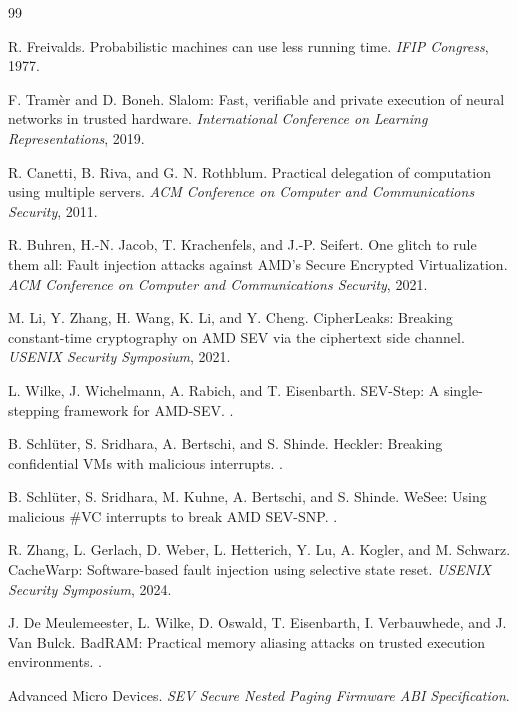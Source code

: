 \documentclass[11pt]{article}
\begin{document}
\begin{thebibliography}{99}

R. Freivalds.
\newblock Probabilistic machines can use less running time.
\newblock \emph{IFIP Congress}, 1977.

F. Tram\`er and D. Boneh.
\newblock Slalom: Fast, verifiable and private execution of neural networks in trusted hardware.
\newblock \emph{International Conference on Learning Representations}, 2019.

R. Canetti, B. Riva, and G. N. Rothblum.
\newblock Practical delegation of computation using multiple servers.
\newblock \emph{ACM Conference on Computer and Communications Security}, 2011.

R. Buhren, H.-N. Jacob, T. Krachenfels, and J.-P. Seifert.
\newblock One glitch to rule them all: Fault injection attacks against AMD's Secure Encrypted
Virtualization.
\newblock \emph{ACM Conference on Computer and Communications Security}, 2021.

M. Li, Y. Zhang, H. Wang, K. Li, and Y. Cheng.
\newblock CipherLeaks: Breaking constant-time cryptography on AMD SEV via the ciphertext side
channel.
\newblock \emph{USENIX Security Symposium}, 2021.

L. Wilke, J. Wichelmann, A. Rabich, and T. Eisenbarth.
\newblock SEV-Step: A single-stepping framework for AMD-SEV.
.

B. Schl\"uter, S. Sridhara, A. Bertschi, and S. Shinde.
\newblock Heckler: Breaking confidential VMs with malicious interrupts.
.

B. Schl\"uter, S. Sridhara, M. Kuhne, A. Bertschi, and S. Shinde.
\newblock WeSee: Using malicious \#VC interrupts to break AMD SEV-SNP.
.

R. Zhang, L. Gerlach, D. Weber, L. Hetterich, Y. Lu, A. Kogler, and M. Schwarz.
\newblock CacheWarp: Software-based fault injection using selective state reset.
\newblock \emph{USENIX Security Symposium}, 2024.

J. De Meulemeester, L. Wilke, D. Oswald, T. Eisenbarth, I. Verbauwhede, and J. Van Bulck.
\newblock BadRAM: Practical memory aliasing attacks on trusted execution environments.
.

Advanced Micro Devices.
\newblock \emph{SEV Secure Nested Paging Firmware ABI Specification}.


\end{thebibliography}
\end{document}

